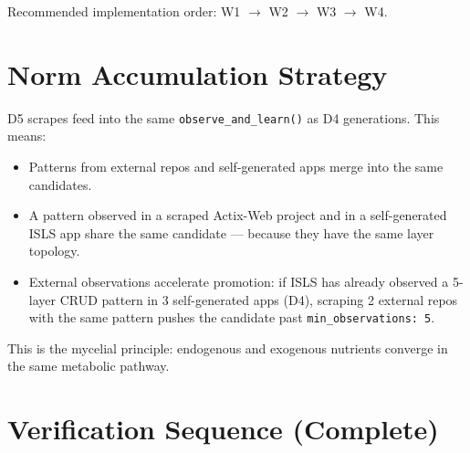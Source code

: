 \documentclass[11pt,a4paper]{article}
\begin{document}
Recommended implementation order: W1 $\to$ W2 $\to$ W3 $\to$ W4.


\section{Norm Accumulation Strategy}

D5 scrapes feed into the same \texttt{observe\_and\_learn()} as D4
generations. This means:

\begin{itemize}[nosep]
\item Patterns from external repos and self-generated apps merge into
      the same candidates.
\item A pattern observed in a scraped Actix-Web project and in a
      self-generated ISLS app share the same candidate --- because
      they have the same layer topology.
\item External observations accelerate promotion: if ISLS has already
      observed a 5-layer CRUD pattern in 3 self-generated apps (D4),
      scraping 2 external repos with the same pattern pushes the
      candidate past \texttt{min\_observations: 5}.
\end{itemize}

This is the mycelial principle: endogenous and exogenous nutrients
converge in the same metabolic pathway.


\section{Verification Sequence (Complete)}
\label{sec:verification}
\end{document}
